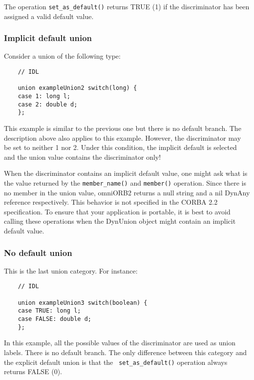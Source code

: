 \documentclass[11pt,twoside,onecolumn]{book}
\begin{document}
The operation {\tt set\_as\_default()} returns TRUE (1) if the
discriminator has been assigned a valid default value.


\subsubsection{Implicit default union}

Consider a union of the following type:

{\small
\begin{verbatim}
    // IDL
    
    union exampleUnion2 switch(long) {
    case 1: long l;
    case 2: double d; 
    };
\end{verbatim}
}

This example is similar to the previous one but there is no default branch.
The description above also applies to this example. However, the
discriminator may be set to neither 1 nor 2. Under this condition, the
implicit default is selected and the union value contains the discriminator
only!

When the discriminator contains an implicit default value, one might ask
what is the value returned by the {\tt member\_name()} and {\tt member()}
operation. Since there is no member in the union value, omniORB2 returns a
null string and a nil DynAny reference respectively. This behavior is not
specified in the CORBA 2.2 specification. To ensure that your application
is portable, it is best to avoid calling these operations when the DynUnion
object might contain an implicit default value.

\subsubsection{No default union}

This is the last union category. For instance:

{\small
\begin{verbatim}
    // IDL
    
    union exampleUnion3 switch(boolean) {
    case TRUE: long l;
    case FALSE: double d; 
    };
\end{verbatim}
}

In this example, all the possible values of the discriminator are used as
union labels. There is no default branch. The only difference between this
category and the explicit default union is that the {\tt
set\_as\_default()} operation always returns FALSE (0).
\end{document}
